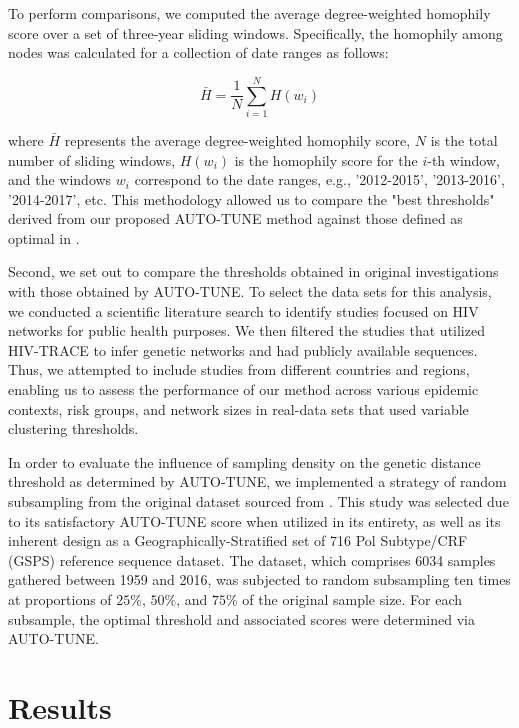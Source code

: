 \documentclass[utf8]{FrontiersinHarvard} %
\begin{document}
To perform comparisons, we computed the average degree-weighted homophily score
over a set of three-year sliding windows. Specifically, the homophily among
nodes was calculated for a collection of date ranges as follows:

\begin{equation} \bar{H} = \frac{1}{N}\sum_{i=1}^{N} H(w_i) \end{equation}

where $\bar{H}$ represents the average degree-weighted homophily score, $N$
is the total number of sliding windows, $H(w_i)$ is the homophily score for
the $i$-th window, and the windows $w_i$ correspond to the date ranges, e.g.,
'2012-2015', '2013-2016', '2014-2017', etc. This methodology allowed us to
compare the "best thresholds" derived from our proposed AUTO-TUNE method
against those defined as optimal in \cite{chato_public_2020}.

Second, we set out to compare the thresholds obtained in original
investigations with those obtained by AUTO-TUNE. To select the data sets for
this analysis, we conducted a scientific literature search to identify studies
focused on HIV networks for public health purposes. We then filtered the
studies that utilized HIV-TRACE to infer genetic networks and had publicly
available sequences. Thus, we attempted to include studies from different
countries and regions, enabling us to assess the performance of our method
across various epidemic contexts, risk groups, and network sizes in real-data
sets that used variable clustering thresholds. 

In order to evaluate the influence of sampling density on the genetic distance
threshold as determined by AUTO-TUNE, we implemented a strategy of random
subsampling from the original dataset sourced from \cite{rhee_national_2019}.
This study was selected due to its satisfactory AUTO-TUNE score when utilized
in its entirety, as well as its inherent design as a Geographically-Stratified
set of 716 Pol Subtype/CRF (GSPS) reference sequence dataset. The dataset,
which comprises 6034 samples gathered between 1959 and 2016, was subjected to
random subsampling ten times at proportions of $25\%$, $50\%$, and $75\%$ of
the original sample size. For each subsample, the optimal threshold and
associated scores were determined via AUTO-TUNE.


\section{Results}
\end{document}
